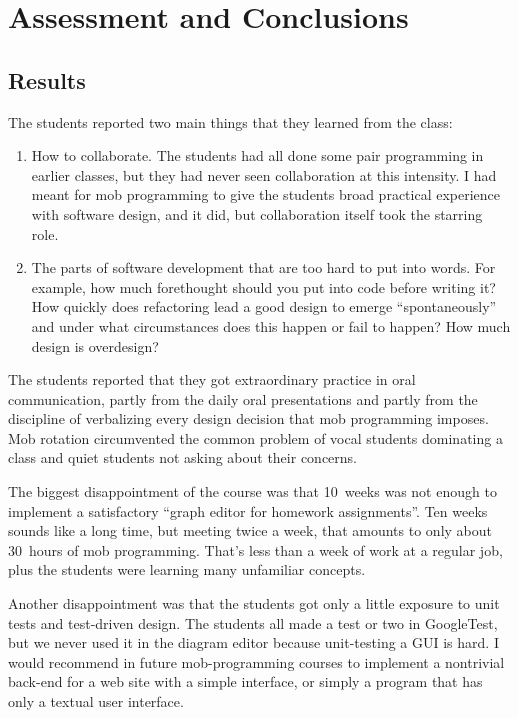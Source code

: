 \documentclass{article}
\begin{document}
\section{Assessment and Conclusions}

\subsection{Results}

The students reported two main things that they learned from the class:

\begin{enumerate}
\item How to collaborate. The students had all done some pair programming in
earlier classes, but they had never seen collaboration at this intensity. I
had meant for mob programming to give the students broad practical experience
with software design, and it did, but collaboration itself took the
starring role.

\item The parts of software development that are too hard to put into words.
For example, how much forethought should you put into code before writing
it? How quickly does refactoring lead a good design to emerge
``spontaneously'' and under what circumstances does this happen or fail to
happen? How much design is overdesign?
\end{enumerate}

The students reported that they got extraordinary practice in oral
communication, partly from the daily oral presentations and partly from the
discipline of verbalizing every design decision that mob programming imposes.
Mob rotation circumvented the common problem of vocal students dominating a
class and quiet students not asking about their concerns.

The biggest disappointment of the course was that 10~weeks was not enough to
implement a satisfactory ``graph editor for homework assignments''. Ten weeks
sounds like a long time, but meeting twice a week, that amounts to only
about 30~hours of mob programming.  That's less than a week of work at a
regular job, plus the students were learning many unfamiliar
concepts.

Another disappointment was that the students got only a little exposure to
unit tests and test-driven design. The students all made a test or two in
GoogleTest, but we never used it in the diagram editor because unit-testing
a GUI is hard. I would recommend in future mob-programming courses to
implement a nontrivial back-end for a web site with a simple interface, or
simply a program that has only a textual user interface.
\end{document}
